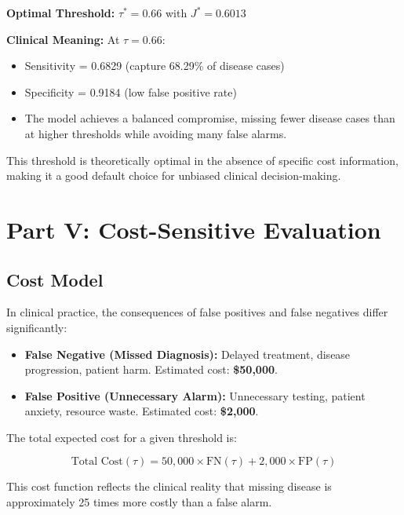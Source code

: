 \documentclass[11pt]{article}
\begin{document}
\textbf{Optimal Threshold:} $\tau^* = 0.66$ with $J^* = 0.6013$

\textbf{Clinical Meaning:}
At $\tau = 0.66$:
\begin{itemize}
    \item Sensitivity = 0.6829 (capture 68.29\% of disease cases)
    \item Specificity = 0.9184 (low false positive rate)
    \item The model achieves a balanced compromise, missing fewer disease cases than at higher thresholds while avoiding many false alarms.
\end{itemize}

This threshold is theoretically optimal in the absence of specific cost information, making it a good default choice for unbiased clinical decision-making.

\newpage

\section{Part V: Cost-Sensitive Evaluation}

\subsection{Cost Model}

In clinical practice, the consequences of false positives and false negatives differ significantly:

\begin{itemize}
    \item \textbf{False Negative (Missed Diagnosis):} Delayed treatment, disease progression, patient harm. Estimated cost: \textbf{\$50,000}.
    \item \textbf{False Positive (Unnecessary Alarm):} Unnecessary testing, patient anxiety, resource waste. Estimated cost: \textbf{\$2,000}.
\end{itemize}

The total expected cost for a given threshold is:

\begin{equation}
    \text{Total Cost}(\tau) = 50{,}000 \times \text{FN}(\tau) + 2{,}000 \times \text{FP}(\tau)
\end{equation}

This cost function reflects the clinical reality that missing disease is approximately 25 times more costly than a false alarm.
\end{document}
